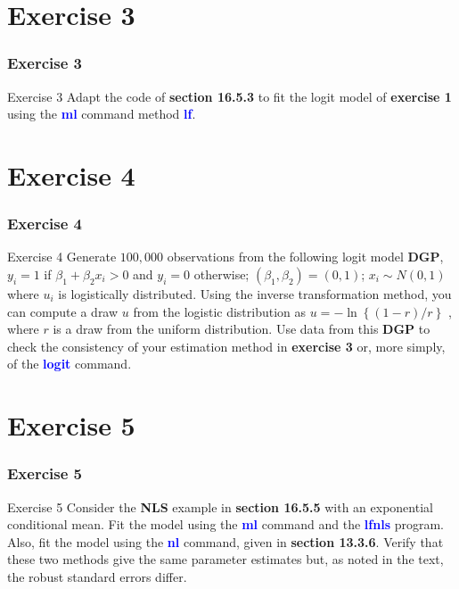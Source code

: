 \documentclass[11pt, aspectratio=169]{beamer}
\begin{document}
	\section{Exercise 3}
		\begin{frame}
			\frametitle{Exercise 3}
			\begin{block}{Exercise 3}
				Adapt the code of \textcolor{red!50}{\textbf{section 16.5.3}} to fit the logit model of \textbf{exercise 1} using the
				\textcolor{blue}{\textbf{ml}} command method \textcolor{blue}{\textbf{lf}}.
			\end{block}
		\end{frame}
	\section{Exercise 4}
		\begin{frame}
			\frametitle{Exercise 4}
			\begin{block}{Exercise 4}
				Generate $100,000$ observations from the following logit model \textbf{DGP},
				$y_{i} = 1$ if $\beta_{1} + \beta_{2}x_{i} > 0$ and $y_{i} = 0$ otherwise;
				$(\beta_{1},\beta_{2}) = (0,1)$; $x_{i} \sim N(0,1)$
				where $u_{i}$ is logistically distributed. Using the inverse transformation method,
				you can compute a draw $u$ from the logistic distribution as $u = -\ln\left\{(1-r)/r\right\}$
				, where $r$ is a draw from the uniform distribution. Use
				data from this \textbf{DGP} to check the consistency of your estimation method in
				\textbf{exercise 3} or, more simply, of the \textcolor{blue}{\textbf{logit}} command.
			\end{block}
		\end{frame}
	\section{Exercise 5}
		\begin{frame}
			\frametitle{Exercise 5}
			\begin{block}{Exercise 5}
				Consider the \textbf{NLS} example in \textcolor{red!50}{\textbf{section 16.5.5}} with an exponential conditional
				mean. Fit the model using the \textcolor{blue}{\textbf{ml}} command and the \textcolor{blue}{\textbf{lfnls}} program. Also, fit
				the model using the \textcolor{blue}{\textbf{nl}} command, given in \textcolor{red!50}{\textbf{section 13.3.6}}. Verify that these
				two methods give the same parameter estimates but, as noted in the text, the
				robust standard errors differ.
			\end{block}
		\end{frame}
\end{document}
